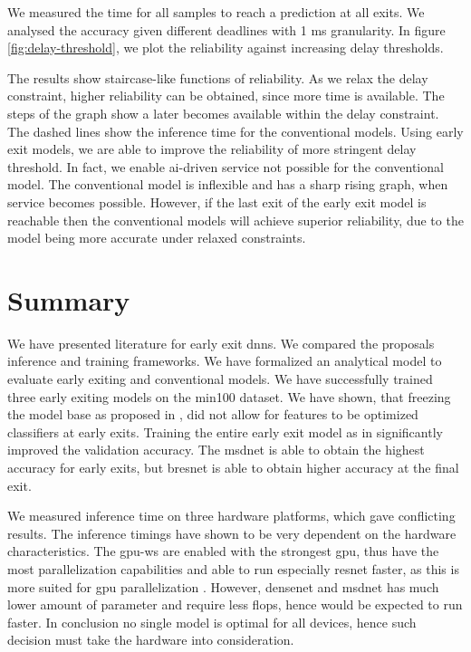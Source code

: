 We measured the time for all samples to reach a prediction at all exits. We analysed the accuracy given different deadlines with 1 ms granularity. In figure \ref{fig:delay-threshold}, we plot the reliability against increasing delay thresholds.

The results show staircase-like functions of reliability. As we relax the delay constraint, higher reliability can be obtained, since more time is available. The steps of the graph show a later becomes available within the delay constraint. The dashed lines show the inference time for the conventional models. Using early exit models, we are able to  improve the reliability of more stringent delay threshold. In fact, we enable \gls{ai}-driven service not possible for the conventional model. The conventional model is inflexible and has a sharp rising graph, when service becomes possible. However, if the last exit of the early exit model is reachable then the conventional models will achieve superior reliability, due to the model being more accurate under relaxed constraints. 

\section{Summary} \label{sec:ee-summary}

We have presented literature for early exit \gls{dnn}s. We compared the proposals inference and training frameworks. We have formalized an analytical model to evaluate early exiting and conventional models. We have successfully trained three early exiting models on the \gls{min100} dataset. We have shown, that freezing the model base as proposed in \cite{leroux_resource-constrained_2015}, did not allow for features to be optimized classifiers at early exits. Training the entire early exit model as in \cite{teerapittayanon_branchynet:_2016} significantly improved the validation accuracy. The \gls{msdnet} is able to obtain the highest accuracy for early exits, but \gls{bresnet} is able to obtain higher accuracy at the final exit. 

We measured inference time on three hardware platforms, which gave conflicting results. The inference timings have shown to be very dependent on the hardware characteristics. The \gls{gpu-ws} are enabled with the strongest \gls{gpu}, thus have the most parallelization capabilities and able to run especially \gls{resnet} faster, as this is more suited for \gls{gpu} parallelization \cite{lee_energy_2019}. However, \gls{densenet} and \gls{msdnet} has much lower amount of parameter and require less \gls{flop}s, hence would be expected to run faster. In conclusion no single model is optimal for all devices, hence such decision must take the hardware into consideration.

